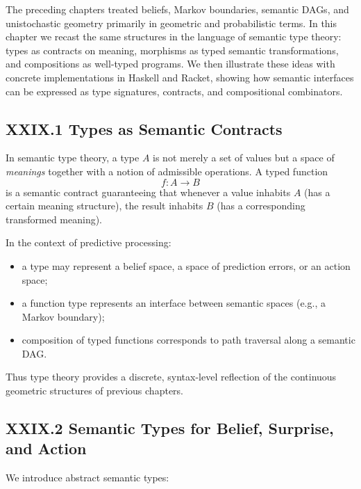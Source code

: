 \documentclass[11pt,letterpaper]{article}
\begin{document}
The preceding chapters treated beliefs, Markov boundaries, semantic DAGs, and unistochastic geometry primarily in geometric and probabilistic terms. In this chapter we recast the same structures in the language of semantic type theory: types as contracts on meaning, morphisms as typed semantic transformations, and compositions as well-typed programs. We then illustrate these ideas with concrete implementations in Haskell and Racket, showing how semantic interfaces can be expressed as type signatures, contracts, and compositional combinators.

\subsection{XXIX.1 Types as Semantic Contracts}

In semantic type theory, a type $A$ is not merely a set of values but a space of \emph{meanings} together with a notion of admissible operations. A typed function
\[
f : A \to B
\]
is a semantic contract guaranteeing that whenever a value inhabits $A$ (has a certain meaning structure), the result inhabits $B$ (has a corresponding transformed meaning).

In the context of predictive processing:

\begin{itemize}
  \item a type may represent a belief space, a space of prediction errors, or an action space;
  \item a function type represents an interface between semantic spaces (e.g., a Markov boundary);
  \item composition of typed functions corresponds to path traversal along a semantic DAG.
\end{itemize}

Thus type theory provides a discrete, syntax-level reflection of the continuous geometric structures of previous chapters.

\subsection{XXIX.2 Semantic Types for Belief, Surprise, and Action}

We introduce abstract semantic types:
\end{document}
